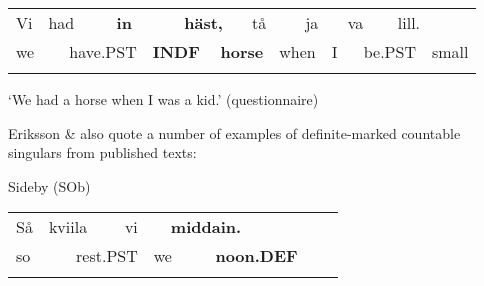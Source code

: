 \begin{tabular}{llllllllllllllll}
\lsptoprule
Vi & \multicolumn{2}{l}{had

} & \multicolumn{2}{l}{{\bfseries in}

} & \multicolumn{2}{l}{{\bfseries häst,}

} & \multicolumn{2}{l}{tå

} & \multicolumn{2}{l}{ja

} & \multicolumn{2}{l}{va

} & \multicolumn{2}{l}{lill.

} & \\
\multicolumn{2}{l}{we

} & \multicolumn{2}{l}{have.PST

} & \multicolumn{2}{l}{{\bfseries INDF}

} & \multicolumn{2}{l}{{\bfseries horse}

} & \multicolumn{2}{l}{when

} & \multicolumn{2}{l}{I

} & \multicolumn{2}{l}{be.PST

} & \multicolumn{2}{l}{small

}\\
\lspbottomrule
\end{tabular}

\begin{styleTranslation}
‘We had a horse when I was a kid.’ (questionnaire)

\end{styleTranslation}

\begin{styleBodytextC}
Eriksson \& \citet{Rendahl1999} also quote a number of examples of definite-marked countable singulars from published texts:

\end{styleBodytextC}


\begin{listWWNumileveli}
\item 

\begin{styleExample}
Sideby (SOb)

\end{styleExample}

\end{listWWNumileveli}

\begin{tabular}{llllllllll}
\lsptoprule
Så & \multicolumn{2}{l}{kviila

} & \multicolumn{2}{l}{vi

} & \multicolumn{2}{l}{{\bfseries middain.}

} & \multicolumn{2}{l}{} & \\
\multicolumn{2}{l}{so

} & \multicolumn{2}{l}{rest.PST

} & \multicolumn{2}{l}{we

} & \multicolumn{2}{l}{{\bfseries noon.DEF}

} & \multicolumn{2}{l}{}\\
\lspbottomrule
\end{tabular}


